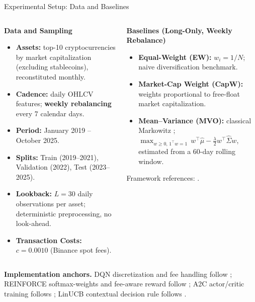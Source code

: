 \documentclass[aspectratio=169]{beamer}
\begin{document}
\begin{frame}{Experimental Setup: Data and Baselines}
\small
\begin{columns}[T,totalwidth=\textwidth]
\begin{column}{0.5\textwidth}
\textbf{Data and Sampling}
\small{
\begin{itemize}\setlength{\itemsep}{0pt}
  \item \textbf{Assets:} top-10 cryptocurrencies by market capitalization (excluding stablecoins), reconstituted monthly.
  \item \textbf{Cadence:} daily OHLCV features; \textbf{weekly rebalancing} every 7 calendar days.
  \item \textbf{Period:} January 2019 – October 2025.
  \item \textbf{Splits:} Train (2019–2021), Validation (2022), Test (2023–2025).
  \item \textbf{Lookback:} $L = 30$ daily observations per asset; deterministic preprocessing, no look-ahead.
  \item \textbf{Transaction Costs:} $c=0.0010$ (Binance spot fees).
\end{itemize}}
\end{column}

\begin{column}{0.5\textwidth}
\textbf{Baselines (Long-Only, Weekly Rebalance)}
\begin{itemize}\setlength{\itemsep}{0pt}
  \item \textbf{Equal-Weight (EW):} $w_i = 1/N$; naive diversification benchmark.
  \item \textbf{Market-Cap Weight (CapW):} weights proportional to free-float market capitalization.
  \item \textbf{Mean–Variance (MVO):} classical Markowitz \citep{markowitz1952portfolio};  
        $\max_{w\ge0,\,1^\top w=1}\, w^\top\hat\mu - \frac{\lambda}{2}w^\top\hat\Sigma w$,  
        estimated from a 60-day rolling window.
\end{itemize}
\footnotesize Framework references: \citep{lucarelli2020dqncrypto,jiang2017cryptocurrency,mnih2016a3c,yang2020ensemble,li2010linucb}.
\end{column}


\end{columns}

\vspace{0.3em}
{\scriptsize
\textbf{Implementation anchors.}
DQN discretization and fee handling follow \citep{lucarelli2020dqncrypto};
REINFORCE softmax-weights and fee-aware reward follow \citep{jiang2017cryptocurrency};
A2C actor/critic training follows \citep{mnih2016a3c,yang2020ensemble};
LinUCB contextual decision rule follows \citep{li2010linucb}.
}
\end{frame}
\end{document}
